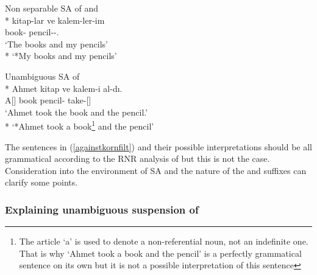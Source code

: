 \begin{exe}
    \ex \label{againstkornfilt}
    \begin{xlist}
        \ex Non separable SA of {\Pl} and {\Poss}\\*
        \gll kitap-lar ve kalem-ler-im \\ 
        book-{\Pl} {\And} pencil-{\Pl}-{\Poss}.{\Fsg} \\
        \glt `The books and my pencils' \\*
        `*My books and my pencils'
        
        \ex Unambiguous SA of {\Acc}\\*
        \gll Ahmet kitap ve kalem-i al-dı. \\ 
        A[{\Nom}] book {\And} pencil-{\Acc} take-{\Pst}[{\Tsg}] \\
        \glt `Ahmet took the book and the pencil.' \\*
        `*Ahmet took a book\footnote{The article `a' is used to denote a non-referential noun, not an indefinite one. That is why `Ahmet took a book and the pencil' is a perfectly grammatical sentence on its own but it is not a possible interpretation of this sentence} and the pencil'
    \end{xlist}
\end{exe}

The sentences in (\ref{againstkornfilt}) and their possible interpretations should be all grammatical according to the RNR analysis of \citet{kornfilt2012revisiting} but this is not the case. Consideration into the environment of SA and the nature of the {\Pl} and {\Poss} suffixes can clarify some points.


\subsubsection{Explaining unambiguous suspension of {\Case}}

